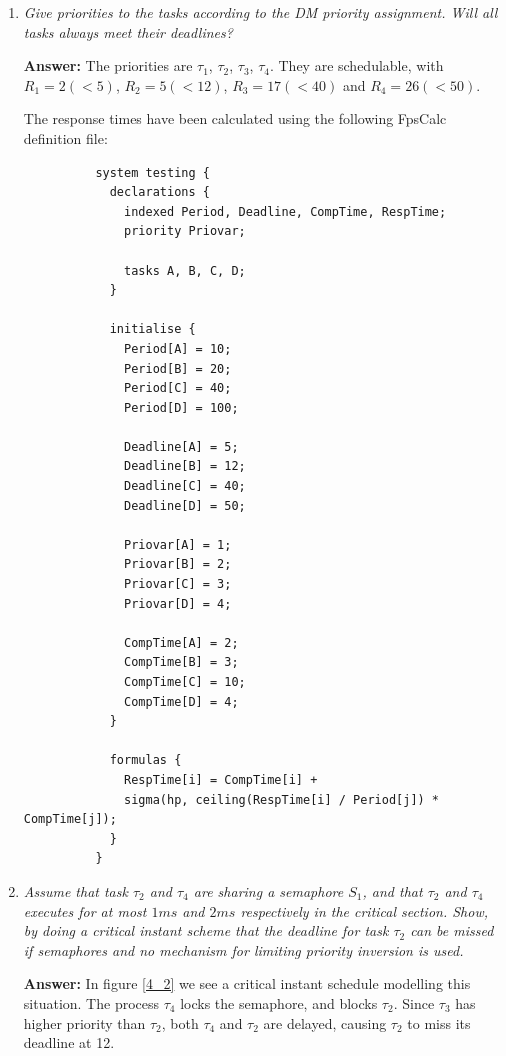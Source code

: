 \documentclass[a4paper,10pt]{article}
\newcommand{\answer}{\textbf{Answer: }}
\begin{document}
\begin{enumerate}
	\item \emph{Give priorities to the tasks according to the DM priority assignment. Will all tasks always meet their deadlines?}
	
	\answer The priorities are $\tau_1$, $\tau_2$, $\tau_3$, $\tau_4$. They are schedulable, with $R_1 = 2 (<5)$, $R_2 = 5 (<12)$, $R_3 = 17 (< 40)$ and $R_4 = 26 (<50)$.

        The response times have been calculated using the following FpsCalc definition file:

        \begin{lstlisting}
          system testing {
            declarations {		
              indexed Period, Deadline, CompTime, RespTime;
              priority Priovar;	
              
              tasks A, B, C, D;
            }
            
            initialise {
              Period[A] = 10;
              Period[B] = 20;
              Period[C] = 40;
              Period[D] = 100;
              
              Deadline[A] = 5;
              Deadline[B] = 12;
              Deadline[C] = 40;
              Deadline[D] = 50;
              
              Priovar[A] = 1;
              Priovar[B] = 2;
              Priovar[C] = 3;
              Priovar[D] = 4;
              
              CompTime[A] = 2;
              CompTime[B] = 3;
              CompTime[C] = 10;
              CompTime[D] = 4;
            }
            
            formulas {
              RespTime[i] = CompTime[i] +
              sigma(hp, ceiling(RespTime[i] / Period[j]) * CompTime[j]);
            }
          }
        \end{lstlisting}

	\item \emph{Assume that task $\tau_2$ and $\tau_4$ are sharing a semaphore $S_1$, and that $\tau_2$ and $\tau_4$ executes for at most $1 ms$ and $2 ms$ respectively in the critical section. Show, by doing a critical instant scheme that the deadline for task $\tau_2$ can be missed if semaphores and no mechanism for limiting priority inversion is used.}
	
	\answer In figure \ref{4_2} we see a critical instant schedule modelling this situation. The process $\tau_4$ locks the semaphore, and blocks $\tau_2$. Since $\tau_3$ has higher priority than $\tau_2$, both $\tau_4$ and $\tau_2$ are delayed, causing $\tau_2$ to miss its deadline at 12.


\end{enumerate}
\end{document}

